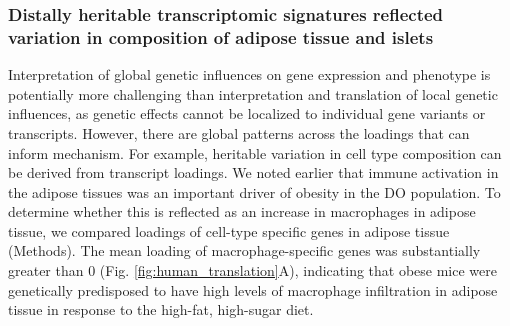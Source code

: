\documentclass[
]{article}
\begin{document}
\subsubsection{Distally heritable transcriptomic signatures reflected
variation in composition of adipose tissue and
islets}\label{distally-heritable-transcriptomic-signatures-reflected-variation-in-composition-of-adipose-tissue-and-islets}

Interpretation of global genetic influences on gene expression and
phenotype is potentially more challenging than interpretation and
translation of local genetic influences, as genetic effects cannot be
localized to individual gene variants or transcripts. However, there are
global patterns across the loadings that can inform mechanism. For
example, heritable variation in cell type composition can be derived
from transcript loadings. We noted earlier that immune activation in the
adipose tissues was an important driver of obesity in the DO population.
To determine whether this is reflected as an increase in macrophages in
adipose tissue, we compared loadings of cell-type specific genes in
adipose tissue (Methods). The mean loading of macrophage-specific genes
was substantially greater than 0 (Fig. \ref{fig:human_translation}A),
indicating that obese mice were genetically predisposed to have high
levels of macrophage infiltration in adipose tissue in response to the
high-fat, high-sugar diet.
\end{document}
